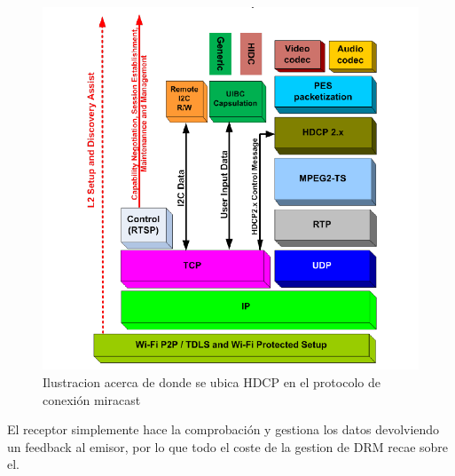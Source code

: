 \begin{figure}[ht]
  \begin{centering}
    \includegraphics[width=1.0\textwidth]{./Imagenes/HDCP_miracast_layers.png}
    \caption{Ilustracion acerca de donde se ubica HDCP en el protocolo de conexión miracast}
  \end{centering}
\end{figure}

El receptor simplemente hace la comprobación y gestiona los datos devolviendo un feedback al emisor, por lo que todo el coste de la gestion de DRM recae sobre el.
